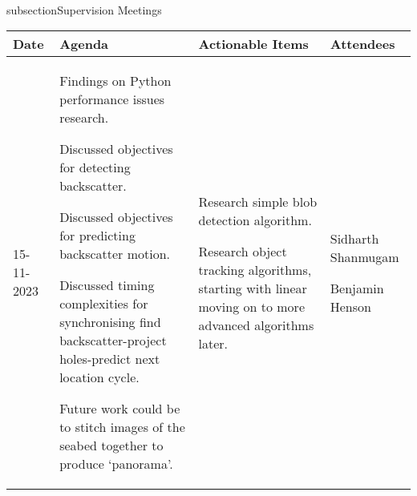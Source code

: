\\subsection{Supervision Meetings}

\begin{table}[!h]
    \centering
    \begin{tabularx}{\textwidth}{|l|X|X|X|}
        \hline
        Date & Agenda & Actionable Items & Attendees \\
        \hline
        \hline
        15-11-2023 & 
        \begin{myitemize}
            \item Findings on Python performance issues research.
            \item Discussed objectives for detecting backscatter.
            \item Discussed objectives for predicting backscatter motion.
            \item Discussed timing complexities for synchronising find backscatter-project holes-predict next location cycle.
            \item Future work could be to stitch images of the seabed together to produce `panorama'.
        \end{myitemize} & 
        \begin{myitemize}
            \item Research simple blob detection algorithm.
            \item Research object tracking algorithms, starting with linear moving on to more advanced algorithms later.
        \end{myitemize} & 
        \begin{myitemize}
            \item Sidharth Shanmugam
            \item Benjamin Henson
        \end{myitemize} \\
        \hline
    \end{tabularx}
\end{table}
